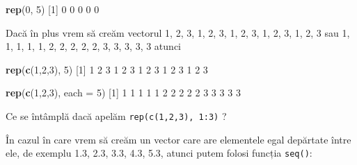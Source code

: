 \documentclass[]{article}
\newenvironment{Shaded}{\begin{snugshade}}{\end{snugshade}}
\newcommand{\DataTypeTok}[1]{\textcolor[rgb]{0.13,0.29,0.53}{#1}}
\newcommand{\DecValTok}[1]{\textcolor[rgb]{0.00,0.00,0.81}{#1}}
\newcommand{\KeywordTok}[1]{\textcolor[rgb]{0.13,0.29,0.53}{\textbf{#1}}}
\newcommand{\NormalTok}[1]{#1}
\begin{document}
\begin{Shaded}
\begin{Highlighting}[]
\KeywordTok{rep}\NormalTok{(}\DecValTok{0}\NormalTok{, }\DecValTok{5}\NormalTok{)}
\NormalTok{[}\DecValTok{1}\NormalTok{] }\DecValTok{0} \DecValTok{0} \DecValTok{0} \DecValTok{0} \DecValTok{0}
\end{Highlighting}
\end{Shaded}

Dacă în plus vrem să creăm vectorul 1, 2, 3, 1, 2, 3, 1, 2, 3, 1, 2, 3,
1, 2, 3 sau 1, 1, 1, 1, 1, 2, 2, 2, 2, 2, 3, 3, 3, 3, 3 atunci

\begin{Shaded}
\begin{Highlighting}[]
\KeywordTok{rep}\NormalTok{(}\KeywordTok{c}\NormalTok{(}\DecValTok{1}\NormalTok{,}\DecValTok{2}\NormalTok{,}\DecValTok{3}\NormalTok{), }\DecValTok{5}\NormalTok{)}
\NormalTok{ [}\DecValTok{1}\NormalTok{] }\DecValTok{1} \DecValTok{2} \DecValTok{3} \DecValTok{1} \DecValTok{2} \DecValTok{3} \DecValTok{1} \DecValTok{2} \DecValTok{3} \DecValTok{1} \DecValTok{2} \DecValTok{3} \DecValTok{1} \DecValTok{2} \DecValTok{3}

\KeywordTok{rep}\NormalTok{(}\KeywordTok{c}\NormalTok{(}\DecValTok{1}\NormalTok{,}\DecValTok{2}\NormalTok{,}\DecValTok{3}\NormalTok{), }\DataTypeTok{each =} \DecValTok{5}\NormalTok{)}
\NormalTok{ [}\DecValTok{1}\NormalTok{] }\DecValTok{1} \DecValTok{1} \DecValTok{1} \DecValTok{1} \DecValTok{1} \DecValTok{2} \DecValTok{2} \DecValTok{2} \DecValTok{2} \DecValTok{2} \DecValTok{3} \DecValTok{3} \DecValTok{3} \DecValTok{3} \DecValTok{3}
\end{Highlighting}
\end{Shaded}

Ce se întâmplă dacă apelăm \texttt{rep(c(1,2,3),\ 1:3)} ?

În cazul în care vrem să creăm un vector care are elementele egal
depărtate între ele, de exemplu 1.3, 2.3, 3.3, 4.3, 5.3, atunci putem
folosi funcția \texttt{seq()}:
\end{document}
